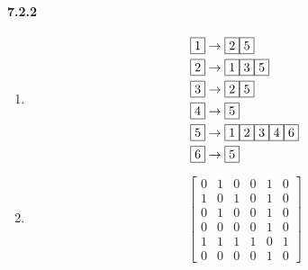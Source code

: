 \documentclass[11pt, letterpaper, twocolumn, fleqn]{article}
\begin{document}
\paragraph{7.2.2}
\begin{enumerate}
  \item 
  \begin{align*}
    &\fbox{1} \rightarrow \fbox{2}\fbox{5} \\
    &\fbox{2} \rightarrow \fbox{1}\fbox{3}\fbox{5}\\
    &\fbox{3} \rightarrow \fbox{2}\fbox{5}\\
    &\fbox{4} \rightarrow \fbox{5}\\
    &\fbox{5} \rightarrow \fbox{1}\fbox{2}\fbox{3}\fbox{4}\fbox{6}\\
    &\fbox{6} \rightarrow \fbox{5}
  \end{align*}
  \item 
  $$\begin{bmatrix}
    0 & 1 & 0 & 0 & 1 & 0 \\
    1 & 0 & 1 & 0 & 1 & 0 \\
    0 & 1 & 0 & 0 & 1 & 0 \\
    0 & 0 & 0 & 0 & 1 & 0 \\
    1 & 1 & 1 & 1 & 0 & 1 \\
    0 & 0 & 0 & 0 & 1 & 0
  \end{bmatrix}$$
\end{enumerate}
\end{document}
